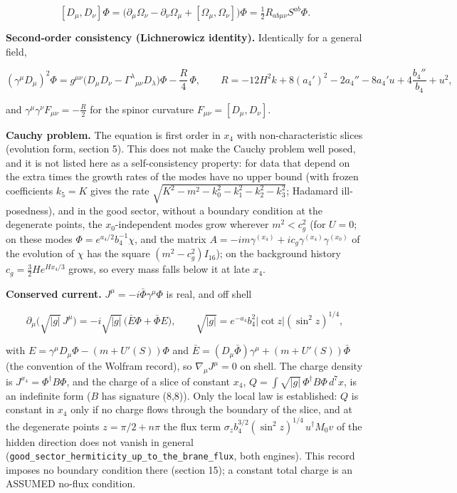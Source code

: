 \documentclass[11pt]{article}
\begin{document}
\[
[D_\mu, D_\nu]\Phi = \big(\partial_\mu\Omega_\nu - \partial_\nu\Omega_\mu + [\Omega_\mu, \Omega_\nu]\big)\Phi = \tfrac12 R_{ab\mu\nu}S^{ab}\Phi .
\]

\textbf{Second-order consistency (Lichnerowicz identity).} Identically for a general field,

\[
(\gamma^\mu D_\mu)^2\Phi = g^{\mu\nu}\big(D_\mu D_\nu - \Gamma^\lambda{}_{\mu\nu}D_\lambda\big)\Phi - \frac{R}{4}\,\Phi, \qquad R = -12H^2k + 8(a_4')^2 - 2a_4'' - 8a_4'u + 4\frac{b_4''}{b_4} + u^2,
\]

and $\gamma^\mu\gamma^\nu F_{\mu\nu} = -\tfrac{R}{2}$ for the spinor curvature $F_{\mu\nu} = [D_\mu, D_\nu]$.

\textbf{Cauchy problem.} The equation is first order in $x_4$ with non-characteristic slices (evolution form, section 5). This does not make the Cauchy problem well posed, and it is not listed here as a self-consistency property: for data that depend on the extra times the growth rates of the modes have no upper bound (with frozen coefficients $k_5 = K$ gives the rate $\sqrt{K^2 - m^2 - k_0^2 - k_1^2 - k_2^2 - k_3^2}$; Hadamard ill-posedness), and in the good sector, without a boundary condition at the degenerate points, the $x_0$-independent modes grow wherever $m^2 < c_g^2$ (for $U = 0$; on these modes $\Phi = e^{a_4/2}b_4^{-1}\chi$, and the matrix $A = -im\gamma^{(x_4)} + ic_g\gamma^{(x_4)}\gamma^{(x_0)}$ of the evolution of $\chi$ has the square $(m^2 - c_g^2)I_{16}$); on the background history $c_g = \tfrac32He^{Hx_4/3}$ grows, so every mass falls below it at late $x_4$.

\textbf{Conserved current.} $J^\mu = -i\bar\Phi\gamma^\mu\Phi$ is real, and off shell

\[
\partial_\mu\big(\sqrt{|g|}\,J^\mu\big) = -i\sqrt{|g|}\,\big(\bar E\Phi + \bar\Phi E\big),\qquad \sqrt{|g|} = e^{-a_4}b_4^2|\cot z|(\sin^2 z)^{1/4},
\]

with $E = \gamma^\mu D_\mu\Phi - (m + U'(S))\Phi$ and $\bar E = (D_\mu\bar\Phi)\gamma^\mu + (m + U'(S))\bar\Phi$ (the convention of the Wolfram record), so $\nabla_\mu J^\mu = 0$ on shell. The charge density is $J^{x_4} = \Phi^\dagger B\Phi$, and the charge of a slice of constant $x_4$, $Q = \int\sqrt{|g|}\,\Phi^\dagger B\Phi\,d^7x$, is an indefinite form ($B$ has signature (8,8)). Only the local law is established: $Q$ is constant in $x_4$ only if no charge flows through the boundary of the slice, and at the degenerate points $z = \pi/2 + n\pi$ the flux term $\sigma_z b_4^{3/2}(\sin^2 z)^{1/4}\,u^\dagger M_0 v$ of the hidden direction does not vanish in general (\texttt{good\_sec\allowbreak{}tor\_herm\allowbreak{}iticity\_\allowbreak{}up\_to\_th\allowbreak{}e\_brane\_\allowbreak{}flux}, both engines). This record imposes no boundary condition there (section 15); a constant total charge is an ASSUMED no-flux condition.
\end{document}
